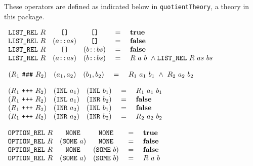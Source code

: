 \documentclass[envcountsame,runningheads]{llncs}
\begin{document}
These operators are defined
as indicated below
in
{\tt quotientTheory},
a theory in this package.

\begin{definition}
\label{listrel}
$\begin{array}[t]{lcccl}
\mbox{\tt LIST\_REL}\ R & \mbox{\tt []} & \mbox{\tt []} & \ = \  & \mbox{\bf true} \\
\mbox{\tt LIST\_REL}\ R & (a \mbox{\tt ::} as) & \mbox{\tt []} & \ = \ & \mbox{\bf false}\\
\mbox{\tt LIST\_REL}\ R & \mbox{\tt []} & (b \mbox{\tt ::} bs) & \ = \  & \mbox{\bf false}\\
\mbox{\tt LIST\_REL}\ R & (a \mbox{\tt ::} as) & (b \mbox{\tt ::} bs) & \ = \ 
   & R\ a\ b\ \wedge \mbox{\tt LIST\_REL}\ R\ as\ bs
\end{array}$
\end{definition}

\begin{definition}
\label{pairrel}
$\begin{array}[t]{lcccl}
(R_1\ \mbox{\tt \#\#\#}\ R_2) & (a_1, a_2) & (b_1, b_2) & \ = \ 
   & R_1\ a_1\ b_1 \ \wedge \ R_2\ a_2\ b_2
\end{array}$
\end{definition}

\begin{definition}
\label{sumrel}
$\begin{array}[t]{lcccl}
(R_1\ \mbox{\tt +++}\ R_2) & (\mbox{\tt INL}\ a_1) & (\mbox{\tt INL}\ b_1) & \ = \ 
   & R_1\ a_1\ b_1  \\
(R_1\ \mbox{\tt +++}\ R_2) & (\mbox{\tt INL}\ a_1) & (\mbox{\tt INR}\ b_2) & \ = \ 
   & \mbox{\bf false}  \\
(R_1\ \mbox{\tt +++}\ R_2) & (\mbox{\tt INR}\ a_2) & (\mbox{\tt INL}\ b_1) & \ = \ 
   & \mbox{\bf false}  \\
(R_1\ \mbox{\tt +++}\ R_2) & (\mbox{\tt INR}\ a_2) & (\mbox{\tt INR}\ b_2) & \ = \ 
   & R_2\ a_2\ b_2  
\end{array}$
\end{definition}

\begin{definition}
\label{optionrel}
$\begin{array}[t]{lcccl}
\mbox{\tt OPTION\_REL}\ R & \mbox{\tt NONE} & \mbox{\tt NONE} & \ = \ 
   & \mbox{\bf true}  \\
\mbox{\tt OPTION\_REL}\ R & (\mbox{\tt SOME}\ a) & \mbox{\tt NONE} & \ = \ 
   & \mbox{\bf false}  \\
\mbox{\tt OPTION\_REL}\ R & \mbox{\tt NONE} & (\mbox{\tt SOME}\ b) & \ = \ 
   & \mbox{\bf false}  \\
\mbox{\tt OPTION\_REL}\ R & (\mbox{\tt SOME}\ a) & (\mbox{\tt SOME}\ b) & \ = \ 
   & R\ a\ b  
\end{array}$
\end{definition}
\end{document}
